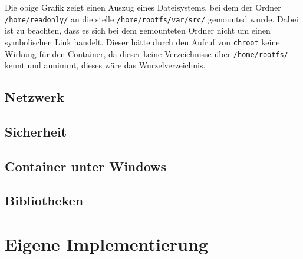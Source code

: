 Die obige Grafik zeigt einen Auszug eines Dateisystems, bei dem der Ordner \texttt{/home/readonly/} an die stelle \texttt{/home/rootfs/var/src/} gemounted wurde. Dabei ist zu beachten, dass es sich bei dem gemounteten Ordner nicht um einen symbolischen Link handelt. Dieser hätte durch den Aufruf von \texttt{chroot} keine Wirkung für den Container, da dieser keine Verzeichnisse über \texttt{/home/rootfs/} kennt und annimmt, dieses wäre das Wurzelverzeichnis.

\subsection{Netzwerk}
\label{sec:netzwerk}

\subsection{Sicherheit}
\label{sec:sicherheit}

\subsection{Container unter Windows}
\label{sec:windows}

\subsection{Bibliotheken}
\label{sec:libs}

\section{Eigene Implementierung}
\label{sec:eigeneImpl}


